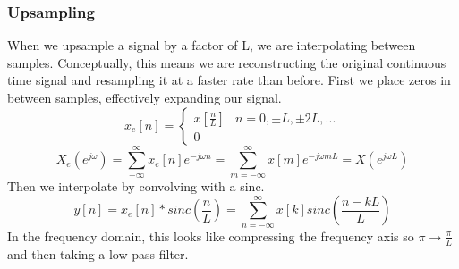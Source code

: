 \documentclass{article}
\begin{document}
\subsubsection{Upsampling}
When we upsample a signal by a factor of L, we are interpolating between samples. Conceptually, this means we are
reconstructing the original continuous time signal and resampling it at a faster rate than before.
First we place zeros in between samples, effectively expanding our signal.
\[
  x_e[n] = \begin{cases}
    x\left[\frac{n}{L}\right] & n=0, \pm L, \pm 2L,...\\
    0
  \end{cases}
\]
$$X_e(e^{j\omega})=\sum_{-\infty}^{\infty}x_e[n]e^{-j\omega n}=\sum_{m=-\infty}^{\infty}x[m]e^{-j\omega mL} = X\left(e^{j\omega L}\right)$$
Then we interpolate by convolving with a sinc.
$$y[n] = x_e[n]*sinc\left(\frac{n}{L}\right) = \sum_{n=-\infty}^{\infty}{x[k]sinc\left(\frac{n-kL}{L}\right)}$$
In the frequency domain, this looks like compressing the frequency axis so $\pi \rightarrow \frac{\pi}{L}$ and then taking a low pass filter.
\begin{figure}[H]
  \centering
\end{figure}
\end{document}
